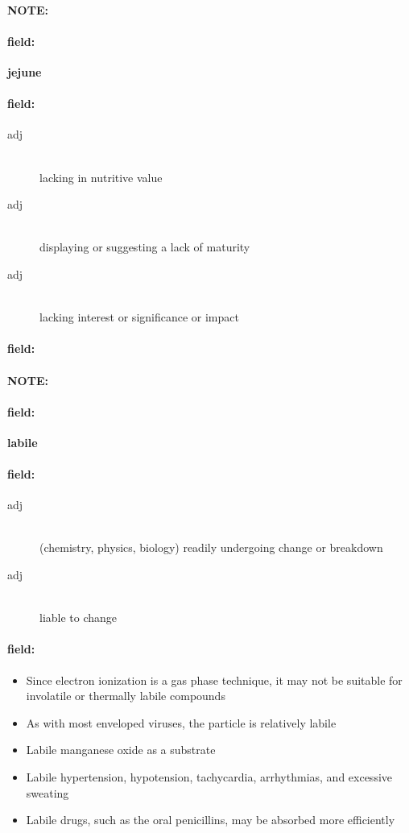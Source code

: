 \documentclass[12pt]{article}
\newenvironment{note}{\paragraph{NOTE:}}{}
\newenvironment{field}{\paragraph{field:}}{}
\begin{document}
\begin{note}
\begin{field}
\textbf{\large jejune}
\end{field}


\begin{field}
\begin{description}
\item[adj] \hfill \\ 
lacking in nutritive value

\item[adj] \hfill \\ 
displaying or suggesting a lack of maturity

\item[adj] \hfill \\ 
lacking interest or significance or impact

\end{description}
\end{field}

\begin{field}
\end{field}
\end{note}
\begin{note}
\begin{field}
\textbf{\large labile}
\end{field}


\begin{field}
\begin{description}
\item[adj] \hfill \\ 
(chemistry, physics, biology) readily undergoing change or breakdown

\item[adj] \hfill \\ 
liable to change

\end{description}
\end{field}

\begin{field}
\begin{itemize}
\item Since electron ionization is a gas phase technique, it may not be suitable for involatile or thermally labile compounds
\item As with most enveloped viruses, the particle is relatively labile
\item Labile manganese oxide as a substrate
\item Labile hypertension, hypotension, tachycardia, arrhythmias, and excessive sweating
\item Labile drugs, such as the oral penicillins, may be absorbed more efficiently
\end{itemize}
\end{field}
\end{note}
\end{document}
